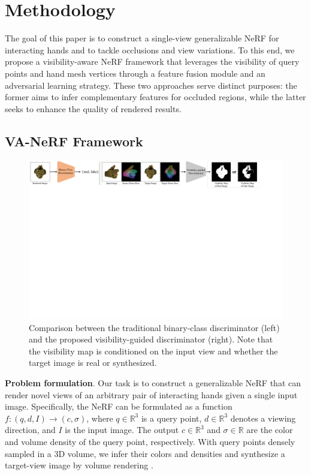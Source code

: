 \documentclass[letterpaper]{article} %
\begin{document}
\section{Methodology}
The goal of this paper is to construct a single-view generalizable NeRF for interacting hands and to tackle occlusions and view variations. To this end, we propose a visibility-aware NeRF framework that leverages the visibility of query points and hand mesh vertices through a feature fusion module and an adversarial learning strategy. These two approaches serve distinct purposes: the former aims to infer complementary features for occluded regions, while the latter seeks to enhance the quality of rendered results.

\subsection{VA-NeRF Framework}
\label{sec:framework}

\begin{figure}[t]
  \centering
  \includegraphics[width=1.0\hsize]{figures/dis.pdf}
  \caption{Comparison between the traditional binary-class discriminator (left) and the proposed visibility-guided discriminator (right). Note that the visibility map is conditioned on the input view and whether the target image is real or synthesized.}
  \label{fig:dis}
\end{figure}

\textbf{Problem formulation}. Our task is to construct a generalizable NeRF that can render novel views of an arbitrary pair of interacting hands given a single input image. Specifically, the NeRF can be formulated as a function $f:(q,d,I)  \to (c, \sigma)$, where $q \in \mathbb{R}^3$ is a query point, $d \in \mathbb{R}^3$ denotes a viewing direction, and $I$ is the input image. The output $c \in \mathbb{R}^3$ and $\sigma \in \mathbb{R}$ are the color and volume density of the query point, respectively. With query points densely sampled in a 3D volume, we infer their colors and densities and synthesize a target-view image by volume rendering \cite{mildenhall2021nerf}.
\end{document}
